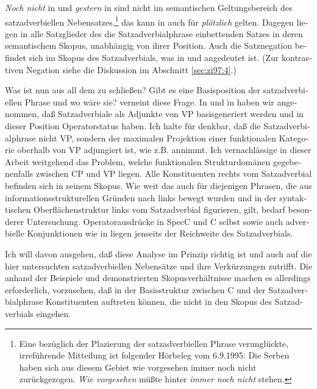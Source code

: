 \documentclass[output=paper, colorlinks, citecolor=brown, booklanguage=german]{langscibook}
\begin{document}
\begin{otherlanguage}{german}
\noindent \textit{Noch nicht} in  und \textit{gestern} in  sind nicht im semantischen Geltungsbereich des satzadverbiellen Nebensatzes,\footnote{Eine bezüglich der Plazierung der satzadverbiellen Phrase verunglückte, irreführende Mitteilung ist folgender Hörbeleg vom 6.9.1995: \ea Die Serben haben sich aus diesem Gebiet wie vorgesehen immer noch nicht zurückgezogen. \z \textit{Wie vorgesehen} müßte hinter \textit{immer noch nicht} stehen.} das kann in  auch für \textit{plötzlich} gelten. Dagegen liegen in  alle Satzglieder des die Satzadverbialphrase einbettenden Satzes in deren semantischem Skopus, unabhängig von ihrer Position. Auch die Satznegation befindet sich im Skopus des Satzadverbials, was in  und  angedeutet ist. (Zur kontrastiven Negation siehe die Diskussion im Abschnitt \ref{sec:zi97:4}.)

Was ist nun aus all dem zu schließen? Gibt es eine Basisposition der satzadverbiellen Phrase und wo wäre sie? \citet{hetland1992satzadverbienimfokus} verneint diese Frage. In \citet{brandt1989satzmodusmodalitatundperformativitat} und in \citet{brandt1992satztyp} haben wir angenommen, daß Satzadverbiale als Adjunkte von VP basisgeneriert werden und in dieser Position Operatorstatus haben. Ich halte für denkbar, daß die Satzadverbialphrase nicht VP, sondern der maximalen Projektion einer funktionalen Kategorie oberhalb von VP adjungiert ist, wie z.B. \citet{haftka94} annimmt. Ich vernachlässige in dieser Arbeit weitgehend das Problem, welche funktionalen Strukturdomänen gegebenenfalls zwischen CP und VP liegen. Alle Konstituenten rechts vom Satzadverbial befinden sich in seinem Skopus. Wie weit das auch für diejenigen Phrasen, die aus informationsstrukturellen Gründen nach links bewegt wurden und in der syntaktischen Oberflächenstruktur links vom Satzadverbial figurieren, gilt, bedarf besonderer Untersuchung. Operatorausdrücke in SpecC und C selbst sowie auch adverbielle Konjunktionen wie in  liegen jenseits der Reichweite des Satzadverbials.

Ich will davon ausgehen, daß diese Analyse im Prinzip richtig ist und auch auf die hier untersuchten satzadverbiellen Nebensätze und ihre Verkürzungen zutrifft. Die anhand der Beispiele  und  demonstrierten Skopusverhältnisse machen es allerdings erforderlich, vorzusehen, daß in der Basisstruktur zwischen C und der Satzadverbialphrase Konstituenten auftreten können, die nicht in den Skopus des Satzadverbials eingehen.


\end{otherlanguage}
\end{document}

